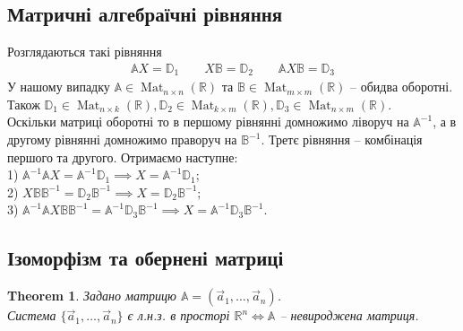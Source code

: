 \documentclass[a4paper, 10pt]{article}
\theoremstyle{theoremdd}
\newtheorem{theorem}{Theorem}[subsection]
\DeclareMathOperator{\Mat}{Mat}
\begin{document}
\subsection{Матричні алгебраїчні рівняння}
Розглядаються такі рівняння
\begin{align*}
\mathbb{A} X = \mathbb{D}_1 \qquad X \mathbb{B} = \mathbb{D}_2 \qquad \mathbb{A} X \mathbb{B} = \mathbb{D}_3
\end{align*}
У нашому випадку $\mathbb{A} \in \Mat_{n \times n}(\mathbb{R})$ та $\mathbb{B} \in \Mat_{m \times m}(\mathbb{R})$ -- обидва оборотні.\\
Також $\mathbb{D}_1 \in \Mat_{n \times k}(\mathbb{R}), \mathbb{D}_2 \in \Mat_{k \times m}(\mathbb{R}), \mathbb{D}_3 \in \Mat_{n \times m}(\mathbb{R})$.\\
Оскільки матриці оборотні то в першому рівнянні домножимо ліворуч на $\mathbb{A}^{-1}$, а в другому рівнянні домножимо праворуч на $\mathbb{B}^{-1}$. Третє рівняння -- комбінація першого та другого. Отримаємо наступне:\\
1) $\mathbb{A}^{-1} \mathbb{A} X = \mathbb{A}^{-1} \mathbb{D}_1 \implies X = \mathbb{A}^{-1} \mathbb{D}_1$;\\
2) $X \mathbb{B} \mathbb{B}^{-1} = \mathbb{D}_2 \mathbb{B}^{-1} \implies X = \mathbb{D}_2 \mathbb{B}^{-1}$;\\
3) $\mathbb{A}^{-1} \mathbb{A} X \mathbb{B} \mathbb{B}^{-1} = \mathbb{A}^{-1} \mathbb{D}_3 \mathbb{B}^{-1} \implies X = \mathbb{A}^{-1} \mathbb{D}_3 \mathbb{B}^{-1}$.

\subsection{Ізоморфізм та обернені матриці}
\begin{theorem}
Задано матрицю $\mathbb{A} = (\vec{a}_1,\dots,\vec{a}_n)$.\\
Система $\{\vec{a}_1, \dots, \vec{a}_n\}$ є л.н.з. в просторі $\mathbb{R}^n \iff \mathbb{A}$ -- невироджена матриця.
\end{theorem}
\end{document}
